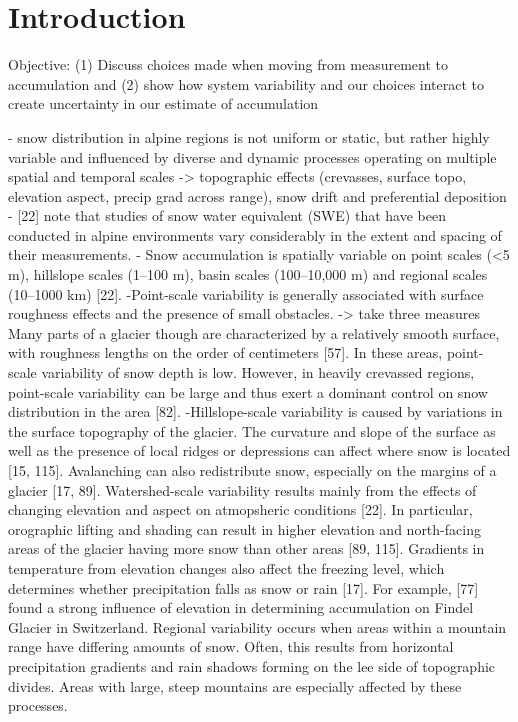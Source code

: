 \documentclass[twocolumn,letterpaper]{igs}
\begin{document}
\section{Introduction}

Objective: (1) Discuss choices made when moving from measurement to accumulation and (2) show how system variability and our choices interact to create uncertainty in our estimate of accumulation

- snow distribution in alpine regions is not uniform or static, but
rather highly variable and influenced by diverse and dynamic processes operating on multiple spatial and temporal scales -> topographic effects (crevasses, surface topo, elevation aspect, precip grad across range), snow drift and preferential deposition
-  [22] note that studies of snow water equivalent (SWE) that have been conducted in
alpine environments vary considerably in the extent and spacing of their measurements.
- Snow accumulation is spatially variable on point scales (<5 m), hillslope scales (1–100 m),
basin scales (100–10,000 m) and regional scales (10–1000 km) [22].
-Point-scale variability is generally associated with surface roughness effects and the
presence of small obstacles. -> take three measures
Many parts of a glacier though
are characterized by a relatively smooth surface, with roughness lengths on the order of
centimeters [57]. In these areas, point-scale variability of snow depth is low. However, in
heavily crevassed regions, point-scale variability can be large and thus exert a dominant
control on snow distribution in the area [82].
-Hillslope-scale variability is caused by variations in the surface topography of the glacier.
The curvature and slope of the surface as well as the presence of local ridges or depressions
can affect where snow is located [15, 115]. Avalanching can also redistribute snow, especially
on the margins of a glacier [17, 89].
Watershed-scale variability results mainly from the effects of changing elevation and
aspect on atmopsheric conditions [22]. In particular, orographic lifting and shading can
result in higher elevation and north-facing areas of the glacier having more snow than other
areas [89, 115]. Gradients in temperature from elevation changes also affect the freezing
level, which determines whether precipitation falls as snow or rain [17]. For example, [77]
found a strong influence of elevation in determining accumulation on Findel Glacier in
Switzerland.
Regional variability occurs when areas within a mountain range have differing amounts of
snow. Often, this results from horizontal precipitation gradients and rain shadows forming
on the lee side of topographic divides. Areas with large, steep mountains are especially
affected by these processes.
\end{document}
